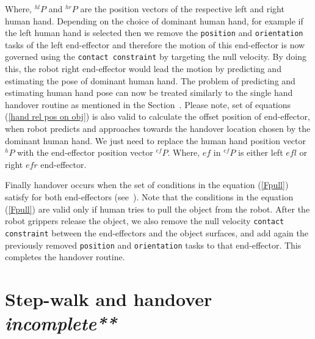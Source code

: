 Where, ${}^{hl}{P}$ and ${}^{hr}{P}$ are the position vectors of the respective left and right human hand. Depending on the choice of dominant human hand, for example if the left human hand is selected then we remove the \texttt{position} and \texttt{orientation} tasks of the left end-effector and therefore the motion of this end-effector is now governed using the \texttt{contact constraint} by targeting the null velocity. By doing this, the robot right end-effector would lead the motion by predicting and estimating the pose of dominant human hand. The problem of predicting and estimating human hand pose can now be treated similarly to the single hand handover routine as mentioned in the Section~. Please note, set of equations (\ref{hand rel pos on obj}) is also valid to calculate the offset position of end-effector, when robot predicts and approaches towards the handover location chosen by the dominant human hand. We just need to replace the human hand position vector ${}^{h}{P}$ with the end-effector position vector ${}^{ef}{P}$. Where, $ef$ in ${}^{ef}{P}$ is either left $efl$ or right $efr$ end-effector.


Finally handover occurs when the set of conditions in the equation (\ref{Fpull}) satisfy for both end-effectors (see~). Note that the conditions in the equation (\ref{Fpull}) are valid only if human tries to pull the object from the robot. After the robot grippers release the object, we also remove the null velocity \texttt{contact constraint} between the end-effectors and the object surfaces, and add again the previously removed \texttt{position} and \texttt{orientation} tasks to that end-effector. This completes the handover routine. 






\section{Step-walk and handover \textit{incomplete**}}

